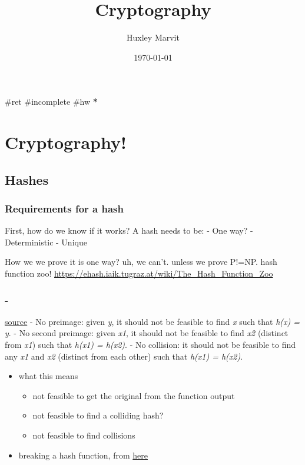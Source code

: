 \documentclass[letterpaper]{article}
\author{Huxley Marvit}
\date{\today}
\title{Cryptography}
\renewcommand{\tableofcontents}{}
\begin{document}
\tableofcontents

\#ret \#incomplete \#hw \textbf{*}

\section{Cryptography!}
\label{sec:org7332979}
\subsection{Hashes}
\label{sec:org543acc4}
\subsubsection{Requirements for a hash}
\label{sec:org2d81fa0}
First, how do we know if it works? A hash needs to be: - One way? -
Deterministic - Unique

How we we prove it is one way? uh, we can't. unless we prove P!=NP. hash
function zoo! \url{https://ehash.iaik.tugraz.at/wiki/The\_Hash\_Function\_Zoo}
\subsubsection{-}
\label{sec:orge98b353}
\href{https://stackoverflow.com/questions/2889473/when-is-it-safe-to-use-a-broken-hash-function}{source} -
No preimage: given \emph{y}, it should not be feasible to find \emph{x} such that
\emph{h(x) = y}. - No second preimage: given \emph{x1}, it should not be feasible
to find \emph{x2} (distinct from \emph{x1}) such that \emph{h(x1) = h(x2)}. - No
collision: it should not be feasible to find any \emph{x1} and \emph{x2} (distinct
from each other) such that \emph{h(x1) = h(x2)}.

\begin{itemize}
\item what this means

\begin{itemize}
\item not feasible to get the original from the function output
\item not feasible to find a colliding hash?
\item not feasible to find collisions
\end{itemize}

\item breaking a hash function, from
\href{https://stackoverflow.com/questions/2889473/when-is-it-safe-to-use-a-broken-hash-function}{here}
\end{itemize}
\end{document}
